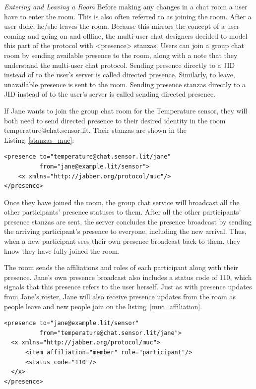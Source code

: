 \emph{Entering and Leaving a Room}
Before making any changes in a chat room a user have to enter the room. This is also often referred to as joining the room. After a user done, he/she leaves the room. Because this mirrors the concept of a user coming and going on and offline, the multi-user chat designers decided to model this part of the protocol with <presence> stanzas. Users can join a group chat room by sending available presence to the room, along with a note that they understand the multi-user chat protocol. Sending presence directly to a JID instead of to the user’s server is called directed presence. Similarly, to leave, unavailable presence is sent to the room. Sending presence stanzas directly to a JID instead of to the user’s server is called sending directed presence.

If Jane wants to join the group chat room for the Temperature sensor, they will both need to send directed presence to their desired identity in the room temperature@chat.sensor.lit. Their stanzas are shown in the Listing~\ref{stanzas_muc}:
\begin{lstlisting}[label=stanzas_muc,caption=Stanzas Format for MUC]
<presence to="temperature@chat.sensor.lit/jane"
          from="jane@example.lit/sensor">
    <x xmlns="http://jabber.org/protocol/muc"/>
</presence>
\end{lstlisting}

Once they have joined the room, the group chat service will broadcast all the other participants' presence statuses to them. After all the other participants’ presence stanzas are sent, the server concludes the presence broadcast by sending the arriving participant’s presence to everyone, including the new arrival. Thus, when a new participant sees their own presence broadcast back to them, they know they have fully joined the room.

The room sends the affiliations and roles of each participant along with their presence. Jane's own presence broadcast also includes a status code of 110, which signals that this presence refers to the user herself. Just as with presence updates from Jane’s roster, Jane will also receive presence updates from the room as people leave and new people join on the listing~\ref{muc_affiliation}.
\begin{lstlisting}[label=muc_affiliation,caption=Server Presence Notification]
<presence to="jane@example.lit/sensor"
          from="temperature@chat.sensor.lit/jane">
  <x xmlns="http://jabber.org/protocol/muc">
      <item affiliation="member" role="participant"/>
      <status code="110"/>
  </x>
</presence>
\end{lstlisting}

